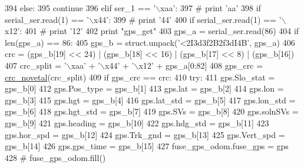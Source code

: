 \begin{DoxyCode}
394             \textcolor{keywordflow}{else}:
395                 \textcolor{keywordflow}{continue}
396         \textcolor{keywordflow}{elif} ser\_1 == \textcolor{stringliteral}{'\(\backslash\)xaa'}:
397             \textcolor{comment}{# print 'aa'}
398             \textcolor{keywordflow}{if} serial\_ser.read(1) == \textcolor{stringliteral}{'\(\backslash\)x44'}:
399                 \textcolor{comment}{# print '44'}
400                 \textcolor{keywordflow}{if} serial\_ser.read(1) == \textcolor{stringliteral}{'\(\backslash\)x12'}:
401                     \textcolor{comment}{# print '12'}
402                     \textcolor{keywordflow}{print} \textcolor{stringliteral}{"gps\_get"}
403                     gps\_a = serial\_ser.read(86)
404                     \textcolor{keywordflow}{if} len(gps\_a) == 86:
405                         gps\_b = struct.unpack(\textcolor{stringliteral}{'<2I3d3f2B2f3dI4B'}, gps\_a)
406                         crc = (gps\_b[19] << 24) | (gps\_b[18] << 16) | (gps\_b[17] << 8) | (gps\_b[16])
407                         crc\_split = \textcolor{stringliteral}{'\(\backslash\)xaa'} + \textcolor{stringliteral}{'\(\backslash\)x44'} + \textcolor{stringliteral}{'\(\backslash\)x12'} + gps\_a[0:82]
408                         gps\_crc = \hyperlink{namespaceserial__af__dox_ae0cff17238b33224c937e9cd91d8a9e4}{crc\_novetal}(crc\_split)
409                         \textcolor{keywordflow}{if} gps\_crc == crc:
410                             \textcolor{keywordflow}{try}:
411                                 gps.Slo\_stat = gps\_b[0]
412                                 gps.Pos\_type = gps\_b[1]
413                                 gps.lat = gps\_b[2]
414                                 gps.lon = gps\_b[3]
415                                 gps.hgt = gps\_b[4]
416                                 gps.lat\_std = gps\_b[5]
417                                 gps.lon\_std = gps\_b[6]
418                                 gps.hgt\_std = gps\_b[7]
419                                 gps.SVs = gps\_b[8]
420                                 gps.solnSVs = gps\_b[9]
421                                 gps.heading = gps\_b[10]
422                                 gps.hdg\_std = gps\_b[11]
423                                 gps.hor\_spd = gps\_b[12]
424                                 gps.Trk\_gnd = gps\_b[13]
425                                 gps.Vert\_spd = gps\_b[14]
426                                 gps.gps\_time = gps\_b[15]
427                                 fuse\_gps\_odom.fuse\_gps = gps
428                                 \textcolor{comment}{# fuse\_gps\_odom.fill()}

\end{DoxyCode}
